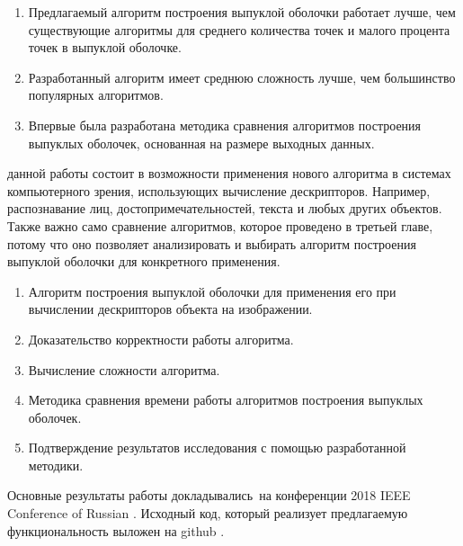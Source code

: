 {\novelty}
\begin{enumerate}
	\item Предлагаемый алгоритм построения выпуклой оболочки работает лучше, чем существующие алгоритмы для среднего количества точек и малого процента точек в выпуклой оболочке.
	\item Разработанный алгоритм имеет среднюю сложность лучше, чем большинство популярных алгоритмов.
	\item Впервые была разработана методика сравнения алгоритмов построения выпуклых оболочек, основанная на размере выходных данных.
\end{enumerate}

{\influence} данной работы состоит в возможности применения нового алгоритма в системах компьютерного зрения, использующих вычисление дескрипторов. Например, распознавание лиц, достопримечательностей, текста и любых других объектов. Также важно само сравнение алгоритмов, которое проведено в третьей главе, потому что оно позволяет анализировать и выбирать алгоритм построения выпуклой оболочки для конкретного применения.

{}
\begin{enumerate}
 	\item Алгоритм построения выпуклой оболочки для применения его при вычислении дескрипторов объекта на изображении.
	\item Доказательство корректности работы алгоритма.
	\item Вычисление сложности алгоритма.
	\item Методика сравнения времени работы алгоритмов построения выпуклых оболочек.
	\item Подтверждение результатов исследования с помощью разработанной методики.
\end{enumerate}

{\probation}
Основные результаты работы докладывались~на конференции 2018 IEEE Conference of Russian \cite{matrokhin2018convex}. Исходный код, который реализует предлагаемую функциональность выложен на github \cite{matrokhin2017github}.
